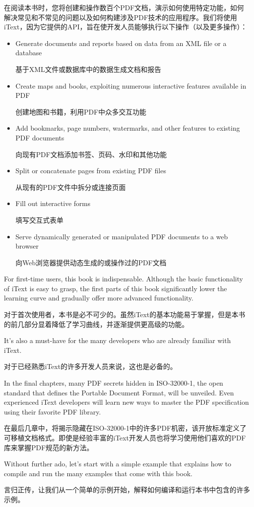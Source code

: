 在阅读本书时，您将创建和操作数百个PDF文档，演示如何使用特定功能，如何解决常见和不常见的问题以及如何构建涉及PDF技术的应用程序。我们将使用iText，因为它提供的API，旨在使开发人员能够执行以下操作（以及更多操作）：
\begin{itemize}
\item
Generate documents and reports based on data from an XML file or a database

基于XML文件或数据库中的数据生成文档和报告

\item
Create maps and books, exploiting numerous interactive features available in PDF

创建地图和书籍，利用PDF中众多交互功能
\item
Add bookmarks, page numbers, watermarks, and other features to existing PDF
documents

向现有PDF文档添加书签、页码、水印和其他功能

\item
Split or concatenate pages from existing PDF files

从现有的PDF文件中拆分或连接页面
\item
Fill out interactive forms

填写交互式表单
\item
Serve dynamically generated or manipulated PDF documents to a web browser 

向Web浏览器提供动态生成的或操作过的PDF文档
\end{itemize}
For first-time users, this book is indispensable. Although the basic functionality of iText is easy to grasp, the first parts of this book significantly lower the learning curve and gradually offer more advanced functionality.

对于首次使用者，本书是必不可少的。虽然iText的基本功能易于掌握，但是本书的前几部分显着降低了学习曲线，并逐渐提供更高级的功能。

It’s also a must-have for the many developers who are already familiar with iText.

对于已经熟悉iText的许多开发人员来说，这也是必备的。

In the final chapters, many PDF secrets hidden in ISO-32000-1, the open standard that defines the Portable Document Format, will be unveiled. Even experienced iText developers will learn new ways to master the PDF specification using their favorite PDF library.

在最后几章中，将揭示隐藏在ISO-32000-1中的许多PDF机密，该开放标准定义了可移植文档格式。即使是经验丰富的iText开发人员也将学习使用他们喜欢的PDF库来掌握PDF规范的新方法。

Without further ado, let’s start with a simple example that explains how to compile and run the many examples that come with this book.

言归正传，让我们从一个简单的示例开始，解释如何编译和运行本书中包含的许多示例。